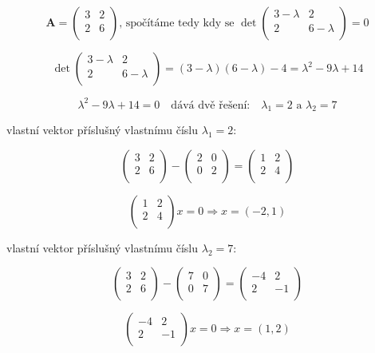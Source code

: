 \begin{priklad}

$$\mathbf{A} =
\begin{pmatrix}
  3 & 2 \\
  2 & 6 \\
\end{pmatrix}\text{, spočítáme tedy kdy se } \det
\begin{pmatrix}
  3-\lambda & 2 \\
  2 & 6-\lambda \\
\end{pmatrix} = 0$$

$$\det\begin{pmatrix}
  3-\lambda & 2 \\
  2 & 6-\lambda \\
\end{pmatrix} = (3-\lambda)(6-\lambda)-4 = \lambda^2 - 9\lambda + 14$$

$$\lambda^2 - 9\lambda + 14 = 0 \quad \text{dává dvě řešení:} \quad \lambda_1 = 2 \text{ a } \lambda_2 = 7$$

\noindent vlastní vektor příslušný vlastnímu číslu $\lambda_1 = 2$:

$$\begin{pmatrix}
  3 & 2 \\
  2 & 6 \\
\end{pmatrix} -
\begin{pmatrix}
  2 & 0 \\
  0 & 2 \\
\end{pmatrix} =
\begin{pmatrix}
  1 & 2 \\
  2 & 4 \\
\end{pmatrix}$$

$$\begin{pmatrix}
  1 & 2 \\
  2 & 4 \\
\end{pmatrix}x = 0 \Rightarrow x=(-2,1)$$

\noindent vlastní vektor příslušný vlastnímu číslu $\lambda_2 = 7$:

$$\begin{pmatrix}
  3 & 2 \\
  2 & 6 \\
\end{pmatrix} -
\begin{pmatrix}
  7 & 0 \\
  0 & 7 \\
\end{pmatrix} =
\begin{pmatrix}
  -4 & 2 \\
  2 & -1 \\
\end{pmatrix}$$

$$\begin{pmatrix}
  -4 & 2 \\
  2 & -1 \\
\end{pmatrix}x = 0 \Rightarrow x=(1,2)$$
\end{priklad}

